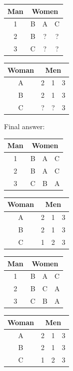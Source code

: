 \documentclass[11pt]{article}
\begin{document}
\begin{qunlist}
\begin{itemize}
{\begin{center}
\begin{tabular}{|c|ccc|}\hline 
Man&\multicolumn{3}{|c|}{Women}\\\hline 
1&B&A&C\\\hline 
2&B&?&?\\\hline 
3&C&?&?\\\hline
\end{tabular} 
\hspace{2cm}
\begin{tabular}{|c|ccc|}\hline 
Woman&\multicolumn{3}{|c|}{Men}\\\hline 
A&2&1&3\\\hline 
B&2&1&3\\\hline 
C&?&?&3\\\hline
\end{tabular}
\end{center}


Final answer: 

\begin{center}
\begin{tabular}{|c|ccc|}\hline 
Man&\multicolumn{3}{|c|}{Women}\\\hline 
1&B&A&C\\\hline 
2&B&A&C\\\hline 
3&C&B&A\\\hline
\end{tabular} 
\hspace{2cm}
\begin{tabular}{|c|ccc|}\hline 
Woman&\multicolumn{3}{|c|}{Men}\\\hline 
A&2&1&3\\\hline 
B&2&1&3\\\hline 
C&1&2&3\\\hline
\end{tabular}
\end{center}

\begin{center}
\begin{tabular}{|c|ccc|}\hline 
Man&\multicolumn{3}{|c|}{Women}\\\hline 
1&B&A&C\\\hline 
2&B&C&A\\\hline 
3&C&B&A\\\hline
\end{tabular} 
\hspace{2cm}
\begin{tabular}{|c|ccc|}\hline 
Woman&\multicolumn{3}{|c|}{Men}\\\hline 
A&2&1&3\\\hline 
B&2&1&3\\\hline 
C&1&2&3\\\hline
\end{tabular}
\end{center}

}
\end{itemize}
\end{qunlist}
\end{document}

